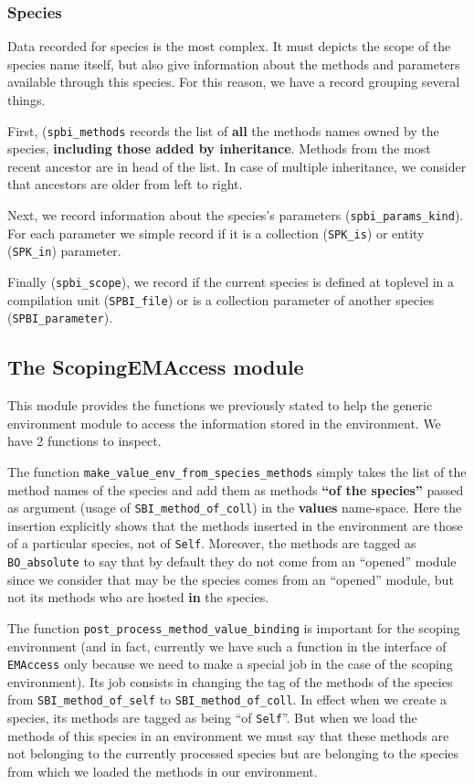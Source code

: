 \subsubsection{Species}
Data recorded for species is the most complex. It must depicts the
scope of the species name itself, but also give information about the
methods and parameters available through this species. For this
reason, we have a record grouping several things.

First, ({\tt spbi\_methods} records the list of {\bf all} the methods
names owned by the species, {\bf including those added by
inheritance}. Methods from the most recent ancestor are in head of the 
list. In case of multiple inheritance, we consider that ancestors
are older from left to right.

Next, we record information about the species's parameters
({\tt spbi\_params\_kind}). For each parameter we simple
record if it is a collection ({\tt SPK\_is}) or entity
({\tt SPK\_in}) parameter.

Finally ({\tt spbi\_scope}), we record if the current species is
defined at toplevel in a compilation unit ({\tt SPBI\_file}) or is a
collection parameter of another species ({\tt SPBI\_parameter}).

\subsection{The {ScopingEMAccess} module}
This module provides the functions we previously stated to help the
generic environment module to access the information stored in the
environment. We have 2 functions to inspect.

\medskip
The function {\tt make\_value\_env\_from\_species\_methods} simply
takes the list of the method names of the species and add them as
methods {\bf ``of the species''} passed as argument
(usage of {\tt SBI\_method\_of\_coll}) in the {\bf values}
name-space. Here the insertion explicitly shows that the methods
inserted in the environment are those of a particular species, not of
{\tt Self}. Moreover, the methods are tagged as {\tt BO\_absolute} to
say that by default they do not come from an ``opened'' module since
we consider that may be the species comes from an ``opened'' module,
but not its methods who are hosted {\bf in} the species.

\medskip
The function {\tt post\_process\_method\_value\_binding} is important
for the scoping environment (and in fact, currently we have such a
function in the interface of {\tt EMAccess} only because we need to
make a special job in the case of the scoping environment). Its job
consists in changing the tag of the methods of the species from
{\tt SBI\_method\_of\_self} to {\tt SBI\_method\_of\_coll}. In effect
when we create a species, its methods are tagged as being
``of {\tt Self}''. But when we load the methods of this species in an
environment we must say that these methods are not belonging to the
currently processed species but are belonging to the species from
which we loaded the methods in our environment.

